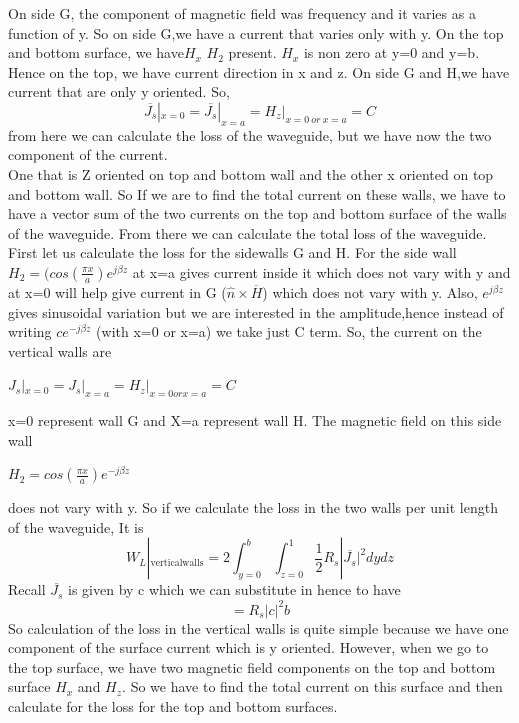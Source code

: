 On side G, the component of magnetic field was frequency and it varies as a function  of y. So on side G,we have a current that varies only with y. On the top and bottom  surface, we have$H_x$ $H_2$ present. 
$H_x$ is non zero at y=0 and y=b.
Hence on the top, we have current direction in x and z.
On side G and H,we have current that are only y oriented. So,
$$\overline{J_s}|_{x=0} = \overline{J_s}|_{x=a} = H_z|_{x=0 \ or \ x=a}=C$$
from here we can calculate the loss of the waveguide, but we have now the two component of the current.\\ One that is  Z oriented on top and bottom wall and the other x oriented  on top and bottom  wall. So If we are to find the total current  on these walls, we have to have a vector sum of the two currents on the top and bottom surface of the walls of the waveguide. From there we can calculate the total loss  of the waveguide.
First let us calculate the loss for the sidewalls G and H. 
For the side wall $H_2=(cos(\frac{\pi x}{a})e^{j\beta z}$ at x=a gives current inside it which does not vary with y and at x=0 will help give current in G ($\hat{n} \times \overline{H}$) which does not vary with y. Also, $e^{j\beta z}$ gives sinusoidal variation but we are interested in the amplitude,hence instead of writing $ce^{-j\beta z}$ (with x=0 or x=a) we take just C term. So, the current  on the vertical  walls are
\begin{center}
$J_s|_{x=0} = J_s|_{x=a} = H_z|_{x=0 or x=a} = C$	
\end{center}
x=0 represent  wall G and X=a represent wall H. The magnetic field on this side wall
\begin{center}
$H_2=cos(\frac{\pi x}{a}) e^{-j\beta z}$	
\end{center}
does not vary with y. So if we calculate the loss in the two walls per unit length of the waveguide, It is
\begin{equation}
W_L|_{\text{verticalwalls}} = 2\int_{y=0}^{b}\int_{z=0}^{1}\frac{1}{2}R_s|\overline{J_s}|^2dydz
\end{equation}
Recall $\overline{J_s}$ is given by c which we can substitute  in hence to have
\begin{equation}
=R_s|c|^2b
\end{equation}
So calculation  of the loss in the vertical walls is quite simple because we have one component of the surface current which is y oriented. 
However, when we go to the top surface, we have two magnetic field components on the top and bottom surface $H_x$ and $H_z$. So we have to find the total current on this surface and then calculate for the loss for the top and bottom  surfaces. 

